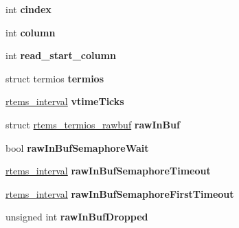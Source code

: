 \begin{DoxyCompactItemize}
int {\bfseries cindex}
\item 
\mbox{\label{structrtems__termios__tty_a47561779e9d411ea3941992690df4bf7}} 
int {\bfseries column}
\item 
\mbox{\label{structrtems__termios__tty_aeca77b2fb456c99ff00948250254fcac}} 
int {\bfseries read\+\_\+start\+\_\+column}
\item 
\mbox{\label{structrtems__termios__tty_a764a56cb3589466e7e580ab6cea96bbb}} 
struct termios {\bfseries termios}
\item 
\mbox{\label{structrtems__termios__tty_a90e2d25f3f72342d31554f9aedc59e4e}} 
\mbox{\hyperlink{group__ClassicTasks_gad39c43f949683d46874e3a5586b93aee}{rtems\+\_\+interval}} {\bfseries vtime\+Ticks}
\item 
\mbox{\label{structrtems__termios__tty_a6d16069a1399a9b3ee099e33a3bbfc6d}} 
struct \mbox{\hyperlink{structrtems__termios__rawbuf}{rtems\+\_\+termios\+\_\+rawbuf}} {\bfseries raw\+In\+Buf}
\item 
\mbox{\label{structrtems__termios__tty_afdffffcc0678dc14383cda1c45d979b2}} 
bool {\bfseries raw\+In\+Buf\+Semaphore\+Wait}
\item 
\mbox{\label{structrtems__termios__tty_abd914f0d81e83c95cb1d6248ff21bd66}} 
\mbox{\hyperlink{group__ClassicTasks_gad39c43f949683d46874e3a5586b93aee}{rtems\+\_\+interval}} {\bfseries raw\+In\+Buf\+Semaphore\+Timeout}
\item 
\mbox{\label{structrtems__termios__tty_a04a176fc79ea6cbf3b34ddd373073628}} 
\mbox{\hyperlink{group__ClassicTasks_gad39c43f949683d46874e3a5586b93aee}{rtems\+\_\+interval}} {\bfseries raw\+In\+Buf\+Semaphore\+First\+Timeout}
\item 
\mbox{\label{structrtems__termios__tty_a8371db3348ad97401750d2bb2236af90}} 
unsigned int {\bfseries raw\+In\+Buf\+Dropped}
\item 
\mbox{\label{structrtems__termios__tty_ae196e7f8e269df2f14cde0d37dc63fbd}} 

\end{DoxyCompactItemize}
